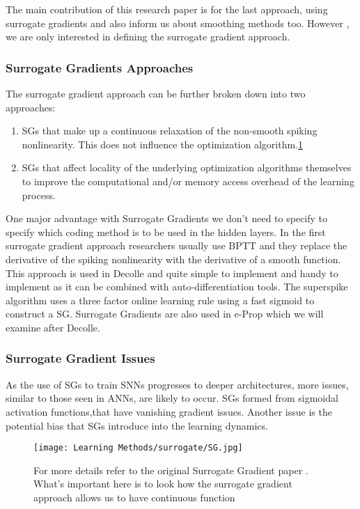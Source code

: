\documentclass[12pt]{report}
\begin{document}
The main contribution of this research paper is for the last approach, using surrogate gradients and also inform us about smoothing methods too. However , we are only interested in defining the surrogate gradient approach.
\subsubsection{Surrogate Gradients Approaches}
The surrogate gradient approach can be further broken down into two approaches:
\begin{enumerate}
    \item SGs that make up a continuous relaxation
of the non-smooth spiking nonlinearity. This does not influence the optimization algorithm.\ref{fig:sg}
    \item SGs that affect locality of the underlying optimization algorithms themselves to improve the computational and/or memory access overhead of the learning process. 
\end{enumerate}
One major advantage with Surrogate Gradients we don't need to specify to specify which coding method is to be used in the hidden layers. In the first surrogate gradient approach researchers usually use BPTT  and they replace the derivative of the spiking nonlinearity with the derivative of a smooth function. This approach is used in Decolle and quite simple to implement and handy to implement as it can be combined with auto-differentiation tools. The superspike algorithm uses a three factor online learning rule using a fast sigmoid to construct a SG. Surrogate Gradients are also used in e-Prop which we will examine after Decolle. 
\subsubsection{Surrogate Gradient Issues}
As the use of SGs to train SNNs progresses to deeper architectures, more issues, similar to those seen in ANNs, are likely to occur. SGs formed from sigmoidal activation functions,that have vanishing gradient issues. Another issue is the potential bias that SGs introduce into the learning dynamics.

\begin{figure}[htp]
    \centering
    \texttt{[image: Learning Methods/surrogate/SG.jpg]}
    \caption{For more details refer to the original Surrogate Gradient paper \cite{Neftci2019}. What's important here is to look how the surrogate gradient approach allows us to have continuous function}
    \label{fig:sg}
\end{figure}
\end{document}
